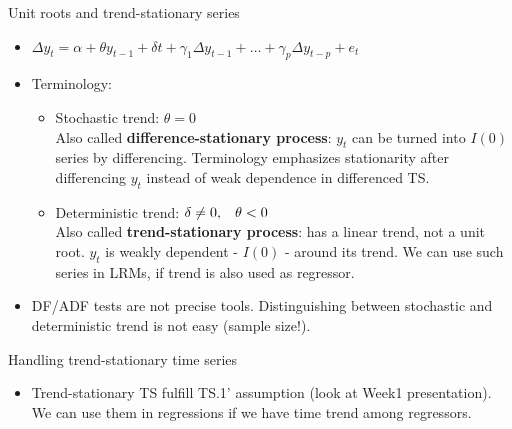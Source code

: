\documentclass{beamer}
\begin{document}

\begin{frame}{Unit roots and trend-stationary series}
\begin{itemize}
\item $ \Delta y_t = \alpha  + \theta y_{t-1} + \delta t + \gamma_1\Delta y_{t-1}+\dots+\gamma_p\Delta y_{t-p}+e_t$
\vspace{0.2cm}
\item Terminology:
\vspace{0.2cm}
\begin{itemize}
\item Stochastic trend: $\theta=0$ \\
Also called \textbf{difference-stationary process}: $y_t$ can be turned into $I(0)$ series by differencing. Terminology emphasizes stationarity after differencing $y_t$ instead of weak dependence in differenced TS.
\vspace{0.2cm}
\item Deterministic trend: $\delta \neq 0, \hspace{0.3cm} \theta<0$ \\
Also called \textbf{trend-stationary process}: has a linear trend, not a unit root. $y_t$ is weakly dependent - $I(0)$ - around its trend. We can use such series in LRMs, if trend is also used as regressor.

\end{itemize}
\vspace{0.3cm}
\item DF/ADF tests are not precise tools. Distinguishing between stochastic and deterministic trend is not easy (sample size!). 
\end{itemize}
\end{frame}


\begin{frame}{Handling trend-stationary time series}
\begin{itemize}
\item Trend-stationary TS fulfill TS.1' assumption (look at Week1 presentation). \\ 
\vspace{0.5cm}
We can use them in regressions if we have time trend among regressors.
\end{itemize}
\end{frame}

\end{document}
